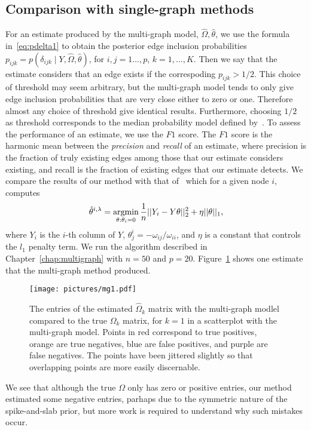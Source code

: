 \documentclass[a4paper, 11pt, oneside]{report}
\DeclareMathOperator{\argmin}{argmin}
\newcommand{\1}{\mathds{1}}
\begin{document}
\subsection{Comparison with single-graph methods}
For an estimate produced by the multi-graph model, $\hat\Omega, \hat\theta$, we use the formula in~\ref{eq:pdelta1} to obtain the
posterior edge inclusion probabilities $p_{ijk} = p(\delta_{ijk} \mid Y, \hat\Omega, \hat\theta)$, for $i,j=1\dots,p$, $k=1,\dots,K$.
Then we say that the estimate considers that an edge exists if the correspoding $p_{ijk} > 1/2$.
This choice of threshold may seem arbitrary, but the multi-graph model tends to
only give edge inclusion probabilities that are very close either to zero or one.
Therefore almost any choice of threshold give identical results.
Furthermore, choosing $1/2$ as threshold corresponds to the median probability
model defined by~\citet{barbieri2004optimal}.
To assess the performance of an estimate, we use the $F1$ score.
The $F1$ score is the harmonic mean between the \emph{precision} and \emph{recall} of an estimate,
where precision is the fraction of truly existing edges among those that our estimate considers existing,
and recall is the fraction of existing edges that our estimate detects.
We compare the results of our method with that of~\citet{mein2006} which for a given node $i$, computes
\[\hat{\theta}^{i, \lambda} = \argmin\displaylimits_{\theta : \theta_i = 0}\frac{1}{n} ||Y_i - Y \theta||_2^2 + \eta ||\theta||_1,\]
where $Y_i$ is the $i$-th column of $Y$, $\theta_j^i = -\omega_{ij}/\omega_{ii}$, and $\eta$ is a constant that controls the $l_1$ penalty term.
We run the algorithm described in Chapter~\ref{chap:multigraph} with $n=50$ and $p=20$.
Figure~\ref{fig:omega-mg} shows one estimate that the multi-graph method produced.
\begin{figure}[bt]
	\centering
	\texttt{[image: pictures/mg1.pdf]}
	\caption{The entries of the estimated $\hat \Omega_k$ matrix with the multi-graph modlel compared to the true $\Omega_k$ matrix, for $k = 1$ in
		a scatterplot with the multi-graph model. Points in red correspond to true positives, orange are true negatives, blue are false positives, and purple are false negatives. The points have been jittered slightly so that overlapping points are more easily discernable.}
	\label{fig:omega-mg}
\end{figure}
We see that although the true $\Omega$ only has zero or positive entries, our method estimated some negative entries,
parhaps due to the symmetric nature of the spike-and-slab prior, but more work is required to understand why such mistakes occur.
\end{document}
